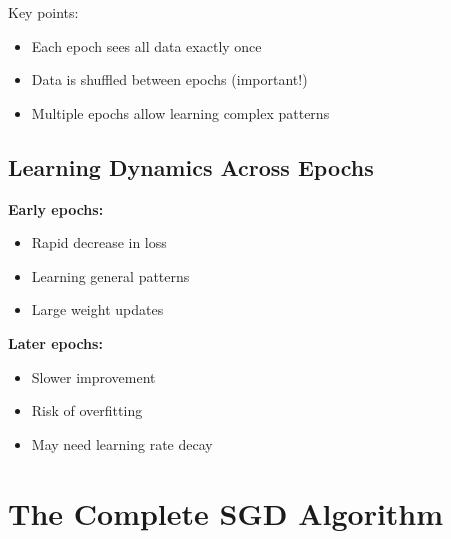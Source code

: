 \documentclass{article}
\begin{document}
Key points:
\begin{itemize}
\item Each epoch sees all data exactly once
\item Data is shuffled between epochs (important!)
\item Multiple epochs allow learning complex patterns
\end{itemize}

\subsection{Learning Dynamics Across Epochs}

\begin{center}
\end{center}

\textbf{Early epochs:}
\begin{itemize}
\item Rapid decrease in loss
\item Learning general patterns
\item Large weight updates
\end{itemize}

\textbf{Later epochs:}
\begin{itemize}
\item Slower improvement
\item Risk of overfitting
\item May need learning rate decay
\end{itemize}

\section{The Complete SGD Algorithm}
\end{document}
